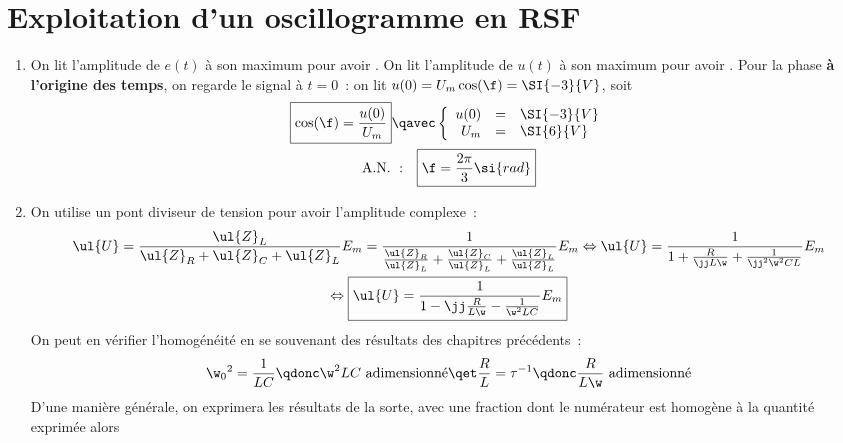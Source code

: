 \documentclass[a4paper, 12pt, final, garamond]{book}
\begin{document}
\section{Exploitation d'un oscillogramme en RSF}
\begin{enumerate}
    \item On lit l'amplitude de $e(t)$ à son maximum pour avoir . On lit l'amplitude de $u(t)$ à son maximum pour avoir
        . Pour la phase \textbf{à l'origine des temps},
        on regarde le signal à $t = 0$~: on lit $u(0) = U_m\cos(\f) =
        \SI{-3}{V}$, soit
        \begin{gather*}
            \boxed{\cos(\f) = \frac{u(0)}{U_m}}
            \qavec
            \left\{
                \begin{array}{rcl}
                    u(0) & = & \SI{-3}{V}\\
                    U_m & = & \SI{6}{V}
                \end{array}
            \right.\\
            \mathrm{A.N.~:}\quad
            \boxed{\f = \frac{2\pi}{3}\si{rad}}
        \end{gather*}
    \item On utilise un pont diviseur de tension pour avoir l'amplitude
        complexe~:
        \begin{gather*}
            \ul{U}
                = \frac{\ul{Z}_L}{\ul{Z}_R + \ul{Z}_C + \ul{Z}_L}E_m
                = \frac{1}{\frac{\ul{Z}_R}{\ul{Z}_L} + \frac{\ul{Z}_C}{\ul{Z}_L}
                + \frac{\ul{Z}_L}{\ul{Z}_L}}E_m
            \Leftrightarrow
            \ul{U}
                = \frac{1}{1 + \frac{R}{\jj L\w} + \frac{1}{\jj^2\w^2CL}}E_m\\
            \Leftrightarrow
            \boxed{
            \ul{U}
                = \frac{1}{1 -\jj \frac{R}{L\w} - \frac{1}{\w^2LC}}E_m
            }
        \end{gather*}
        On peut en vérifier l'homogénéité en se souvenant des résultats des
        chapitres précédents~:
        \begin{gather*}
            \w_0{}^2 = \frac{1}{LC}
            \qdonc
            \w^2LC \text{ adimensionné}
            \qet
            \frac{R}{L} = \tau^{-1}
            \qdonc
            \frac{R}{L\w} \text{ adimensionné}
        \end{gather*}
        D'une manière générale, on exprimera les résultats de la sorte, avec une
        fraction dont le numérateur est homogène à la quantité exprimée alors

\end{enumerate}
\end{document}
